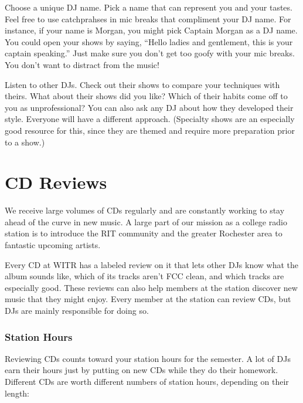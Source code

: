 \documentclass{witrman}
\begin{document}
Choose a unique DJ name.  Pick a name that can represent you and your tastes.
Feel free to use catchprahses in mic breaks that compliment your DJ name.  For
instance, if your name is Morgan, you might pick Captain Morgan as a DJ name.
You could open your shows by saying, ``Hello ladies and gentlement, this is your
captain speaking.''  Just make sure you don't get too goofy with your mic
breaks.  You don't want to distract from the music!

Listen to other DJs.  Check out their shows to compare your techniques with
theirs.  What about their shows did you like?  Which of their habits come off to
you as unprofessional?  You can also ask any DJ about how they developed their
style.  Everyone will have a different approach.  (Specialty shows are an
especially good resource for this, since they are themed and require more
preparation prior to a show.)


\chapter{CD Reviews}

We receive large volumes of CDs regularly and are constantly working to stay
ahead of the curve in new music.  A large part of our mission as a college radio
station is to introduce the RIT community and the greater Rochester area to
fantastic upcoming artists.

Every CD at WITR has a labeled review on it that lets other DJs know what the
album sounds like, which of its tracks aren't FCC clean, and which tracks are
especially good.  These reviews can also help members at the station discover
new music that they might enjoy.  Every member at the station can review CDs,
but DJs are mainly responsible for doing so.


\subsection{Station Hours}

Reviewing CDs counts toward your station hours for the semester.  A lot of DJs earn
their hours just by putting on new CDs while they do their homework.  Different
CDs are worth different numbers of station hours, depending on their length:
\begin{tightitemize}
\end{tightitemize}
\end{document}
